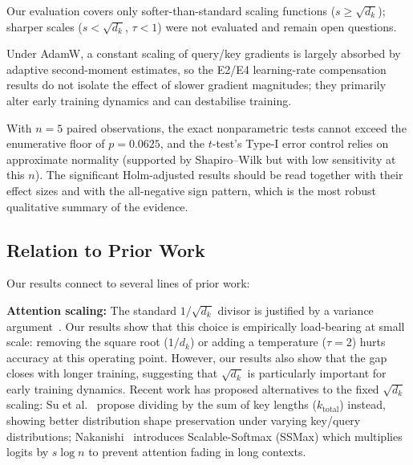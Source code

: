 \documentclass[10pt,a4paper]{article}
\begin{document}
Our evaluation covers only softer-than-standard scaling functions ($s \ge \sqrt{d_k}$); sharper scales ($s < \sqrt{d_k}$, $\tau < 1$) were not evaluated and remain open questions.

Under AdamW, a constant scaling of query/key gradients is largely absorbed by adaptive second-moment estimates, so the E2/E4 learning-rate compensation results do not isolate the effect of slower gradient magnitudes; they primarily alter early training dynamics and can destabilise training.

With $n = 5$ paired observations, the exact nonparametric tests cannot exceed the enumerative floor of $p = 0.0625$, and the $t$-test's Type-I error control relies on approximate normality (supported by Shapiro--Wilk but with low sensitivity at this $n$). The significant Holm-adjusted results should be read together with their effect sizes and with the all-negative sign pattern, which is the most robust qualitative summary of the evidence.

\subsection{Relation to Prior Work}

Our results connect to several lines of prior work:

\textbf{Attention scaling:} The standard $1/\sqrt{d_k}$ divisor is justified by a variance argument~\cite{vaswani2017}. Our results show that this choice is empirically load-bearing at small scale: removing the square root ($1/d_k$) or adding a temperature ($\tau = 2$) hurts accuracy at this operating point. However, our results also show that the gap closes with longer training, suggesting that $\sqrt{d_k}$ is particularly important for early training dynamics. Recent work has proposed alternatives to the fixed $\sqrt{d_k}$ scaling: Su et al.~\cite{su2024alternative} propose dividing by the sum of key lengths ($k_{\text{total}}$) instead, showing better distribution shape preservation under varying key/query distributions; Nakanishi~\cite{nakanishi2025scalable} introduces Scalable-Softmax (SSMax) which multiplies logits by $s \log n$ to prevent attention fading in long contexts.
\end{document}
